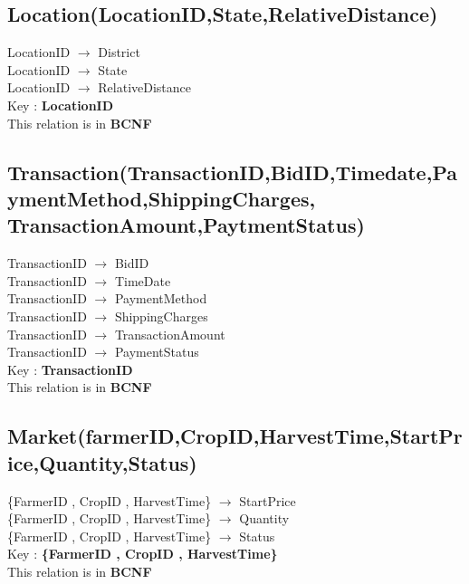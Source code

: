 \documentclass{article}
\begin{document}
 \subsection*{Location(LocationID,State,RelativeDistance)}
 LocationID $\longrightarrow$ District  \\
 LocationID $\longrightarrow$ State  \\
 LocationID $\longrightarrow$ RelativeDistance  \\
 
Key : \textbf{LocationID}\\
This relation is in \textbf{BCNF}

\subsection*{Transaction(TransactionID,BidID,Timedate,PaymentMethod,ShippingCharges,\\TransactionAmount,PaytmentStatus)}
TransactionID $\longrightarrow$  BidID        \\
TransactionID $\longrightarrow$  TimeDate       \\
TransactionID $\longrightarrow$  PaymentMethod   \\
TransactionID $\longrightarrow$  ShippingCharges        \\
TransactionID $\longrightarrow$  TransactionAmount      \\
TransactionID $\longrightarrow$  PaymentStatus        \\

Key : \textbf{TransactionID}\\
This relation is in \textbf{BCNF}

\subsection*{Market(farmerID,CropID,HarvestTime,StartPrice,Quantity,Status)}
 \{FarmerID , CropID , HarvestTime\} $\longrightarrow$  StartPrice        \\
 \{FarmerID , CropID , HarvestTime\} $\longrightarrow$  Quantity     \\
 \{FarmerID , CropID , HarvestTime\} $\longrightarrow$  Status        \\

Key : \textbf{\{FarmerID , CropID , HarvestTime\}}\\
This relation is in \textbf{BCNF}
\end{document}
